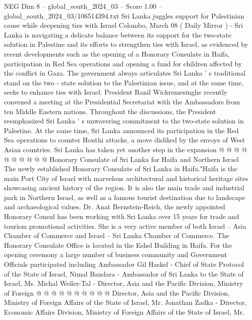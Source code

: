 \begin{textsample}{NEG Dim 8 – global\_south\_2024\_03 – Score 1.00 – global\_south\_2024\_03/106514394.txt}  \label{ex:f8_neg_367}
Sri Lanka juggles support for Palestinian cause while deepening ties with Israel Colombo, March 08 ( Daily Mirror ) - Sri Lanka is navigating a delicate balance between its support for the two-state solution in Palestine and its efforts to strengthen ties with Israel, as evidenced by recent developments such as the opening of a Honorary Consulate in Haifa, participation in Red Sea operations and opening a fund for children affected by the conflict in Gaza.
The government always articulates Sri Lanka ' s traditional stand on the two - state solution to the Palestinian issue, and at the same time, seeks to enhance ties with Israel.
President Ranil Wickremesinghe recently convened a meeting at the Presidential Secretariat with the Ambassadors from ten Middle Eastern nations.
Throughout the discussions, the President reemphasized Sri Lanka ' s unwavering commitment to the two-state solution in Palestine.
At the same time, Sri Lanka announced its participation in the Red Sea operations to counter Houthi attacks, a move disliked by the envoys of West Asian countries.
Sri Lanka has taken yet another step in the expansion @ @ @ @ @ @ @ @ @ @ Honorary Consulate of Sri Lanka for Haifa and Northern Israel The newly established Honorary Consulate of Sri Lanka in Haifa."Haifa is the main Port City of Israel with marvelous architectural and historical heritage sites showcasing ancient history of the region.
It is also the main trade and industrial park in Northern Israel, as well as a famous tourist destination due to landscape and archaeological values.
Dr.
Anat Bernstein-Reich, the newly appointed Honorary Consul has been working with Sri Lanka over 15 years for trade and tourism promotional activities.
She is a very active member of both Israel -- Asia Chamber of Commerce and Israel -- Sri Lanka Chamber of Commerce.
The Honorary Consulate Office is located in the Eshel Building in Haifa.
For the opening ceremony a large number of business community and Government Officials participated including Ambassador Gil Haskel - Chief of State Protocol of the State of Israel, Nimal Bandara - Ambassador of Sri Lanka to the State of Israel, Ms.
Michal Weiler-Tal - Director, Asia and the Pacific Division, Ministry of Foreign @ @ @ @ @ @ @ @ @ @ Director, Asia and the Pacific Division, Ministry of Foreign Affairs of the State of Israel, Mr.
Jonathan Zadka - Director, Economic Affairs Division, Ministry of Foreign Affairs of the State of Israel, Mr.

\end{textsample}

